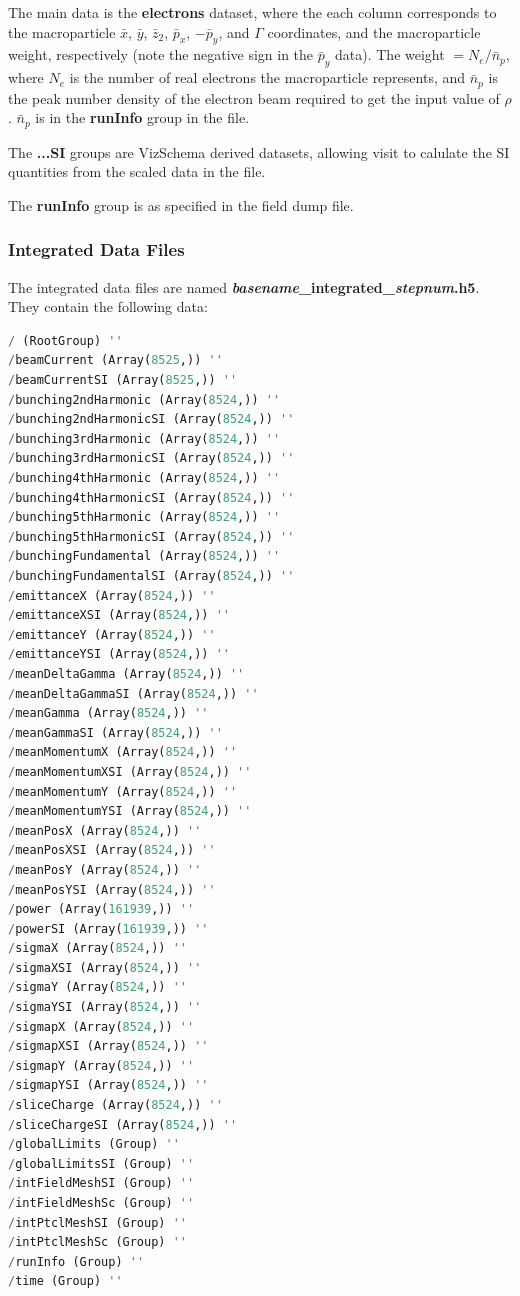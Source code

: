 \documentclass[12pt]{article}%
\begin{document}
The main data is the {\bf electrons} dataset, where the each column corresponds to the macroparticle $\bar{x}$, $\bar{y}$, $\bar{z}_2$, $\bar{p}_x$, $-\bar{p}_y$, and $\Gamma$ coordinates, and the macroparticle weight, respectively (note the negative sign in the $\bar{p}_y$ data). The weight $= N_e / \bar{n}_p$, where $N_e$ is the number of real electrons the macroparticle represents, and $\bar{n}_p$ is the peak number density of the electron beam required to get the input value of $\rho$. $\bar{n}_p$ is in the {\bf runInfo} group in the file.

The {\bf ...SI} groups are VizSchema derived datasets, allowing visit to calulate the SI quantities from the scaled data in the file.

The {\bf runInfo} group is as specified in the field dump file.

\subsubsection{Integrated Data Files}

The integrated data files are named {\bf \textit{basename}\_integrated\_\textit{stepnum}.h5}. They contain the following data:

\begin{lstlisting}[language=python]
/ (RootGroup) ''
/beamCurrent (Array(8525,)) ''
/beamCurrentSI (Array(8525,)) ''
/bunching2ndHarmonic (Array(8524,)) ''
/bunching2ndHarmonicSI (Array(8524,)) ''
/bunching3rdHarmonic (Array(8524,)) ''
/bunching3rdHarmonicSI (Array(8524,)) ''
/bunching4thHarmonic (Array(8524,)) ''
/bunching4thHarmonicSI (Array(8524,)) ''
/bunching5thHarmonic (Array(8524,)) ''
/bunching5thHarmonicSI (Array(8524,)) ''
/bunchingFundamental (Array(8524,)) ''
/bunchingFundamentalSI (Array(8524,)) ''
/emittanceX (Array(8524,)) ''
/emittanceXSI (Array(8524,)) ''
/emittanceY (Array(8524,)) ''
/emittanceYSI (Array(8524,)) ''
/meanDeltaGamma (Array(8524,)) ''
/meanDeltaGammaSI (Array(8524,)) ''
/meanGamma (Array(8524,)) ''
/meanGammaSI (Array(8524,)) ''
/meanMomentumX (Array(8524,)) ''
/meanMomentumXSI (Array(8524,)) ''
/meanMomentumY (Array(8524,)) ''
/meanMomentumYSI (Array(8524,)) ''
/meanPosX (Array(8524,)) ''
/meanPosXSI (Array(8524,)) ''
/meanPosY (Array(8524,)) ''
/meanPosYSI (Array(8524,)) ''
/power (Array(161939,)) ''
/powerSI (Array(161939,)) ''
/sigmaX (Array(8524,)) ''
/sigmaXSI (Array(8524,)) ''
/sigmaY (Array(8524,)) ''
/sigmaYSI (Array(8524,)) ''
/sigmapX (Array(8524,)) ''
/sigmapXSI (Array(8524,)) ''
/sigmapY (Array(8524,)) ''
/sigmapYSI (Array(8524,)) ''
/sliceCharge (Array(8524,)) ''
/sliceChargeSI (Array(8524,)) ''
/globalLimits (Group) ''
/globalLimitsSI (Group) ''
/intFieldMeshSI (Group) ''
/intFieldMeshSc (Group) ''
/intPtclMeshSI (Group) ''
/intPtclMeshSc (Group) ''
/runInfo (Group) ''
/time (Group) ''
\end{lstlisting}
\end{document}
